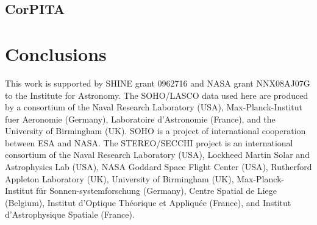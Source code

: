 \documentclass[structabstract]{aa}
\begin{document}
\subsection{CorPITA}
\label{subsect:corpita}

\section{Conclusions}
\label{sect:conclusions}


\begin{acknowledgements}
This work is supported by SHINE grant 0962716 and NASA grant NNX08AJ07G to the Institute for Astronomy. The SOHO/LASCO data used here are produced by a consortium of the Naval Research Laboratory (USA), Max-Planck-Institut fuer Aeronomie (Germany), Laboratoire d'Astronomie (France), and the University of Birmingham (UK). SOHO is a project of international cooperation between ESA and NASA. The STEREO/SECCHI project is an international consortium of the Naval Research Laboratory (USA), Lockheed Martin Solar and Astrophysics Lab (USA), NASA Goddard Space Flight Center (USA), Rutherford Appleton Laboratory (UK), University of Birmingham (UK), Max-Planck-Institut f\"{u}r Sonnen-systemforschung (Germany), Centre Spatial de Liege (Belgium), Institut d'Optique Th\'{e}orique et Appliqu\'{e}e (France), and Institut d'Astrophysique Spatiale (France). 
\end{acknowledgements}




  
\end{document}
